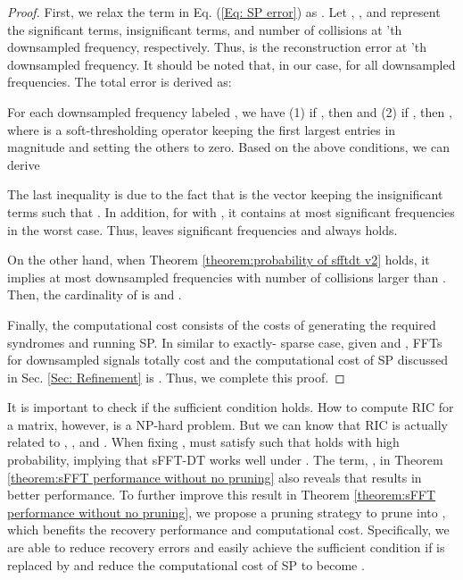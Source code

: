 \documentclass[journal,onecolumn,11pt]{IEEEtran}
\begin{document}
\begin{proof}
First, we relax the term  in Eq. (\ref{Eq: SP error}) as .
Let  , , and  represent the significant terms, insignificant terms, and number of collisions at 'th downsampled frequency, respectively.
Thus,  is the reconstruction error at 'th downsampled frequency.
It should be noted that, in our case, 
for all downsampled frequencies.
The total error is derived as:

For each downsampled frequency labeled , we have (1)  if , then  and
(2) if , then ,
where  is a soft-thresholding operator keeping the first  largest entries in magnitude and setting the others to zero.
Based on the above conditions, we can derive

The last inequality is due to the fact that  is the vector keeping the insignificant terms such that .
In addition, for  with , it contains at most  significant frequencies in the worst case.
Thus,  leaves  significant frequencies and
 always holds.

On the other hand, when Theorem \ref{theorem:probability of sfftdt v2} holds, it implies at most  downsampled frequencies with number of collisions larger than .
Then, the cardinality of  is  and .

Finally, the computational cost consists of the costs of generating the required syndromes and running SP.
In similar to exactly- sparse case, given  and , FFTs for downsampled signals totally cost  and the computational cost of SP discussed in Sec. \ref{Sec: Refinement} is .
Thus, we complete this proof.
\end{proof}

It is important to check if the sufficient condition  holds.
How to compute RIC for a matrix, however, is a NP-hard problem.
But we can know that RIC is actually related to , , and .
When fixing ,  must satisfy  such that  holds with high probability, implying that sFFT-DT works well under .
The term, , in Theorem \ref{theorem:sFFT performance without no pruning} also reveals that  results in better performance.
To further improve this result in Theorem \ref{theorem:sFFT performance without no pruning}, we propose a pruning strategy to prune  into , which benefits the recovery performance and computational cost.
Specifically, we are able to reduce recovery errors and easily achieve the sufficient condition if  is replaced by  and reduce the computational cost of SP to become .
\end{document}
